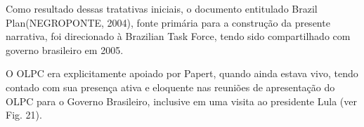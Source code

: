 \documentclass[
12pt,		%
openright,	%
twoside,  %
a4paper,			%
chapter=TITLE,		%
english,			%
french,				%
spanish,			%
brazil				%
]{USPSC-classe/USPSC}
\begin{document}
Como resultado dessas tratativas iniciais, o documento entitulado \textquotedbl Brazil Plan\textquotedbl   (NEGROPONTE, 2004), fonte prim\'aria para a constru\c{c}\~ao da presente narrativa, foi direcionado \`a \textquotedbl Brazilian Task Force\textquotedbl , tendo sido compartilhado com governo brasileiro em 2005.








O OLPC era explicitamente apoiado por Papert, quando ainda estava vivo, tendo contado com sua presen\c{c}a ativa e eloquente nas reuni\~oes de apresenta\c{c}\~ao do OLPC para o Governo Brasileiro, inclusive em uma visita ao presidente Lula (ver Fig. 21).
\end{document}
